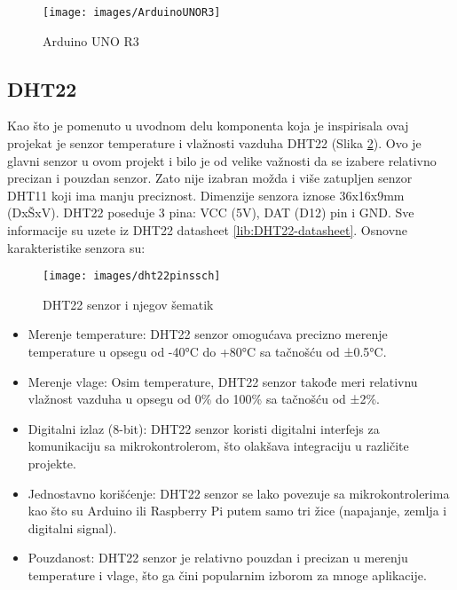 \documentclass[a4paper, 12pt]{article}
\begin{document}
\begin{figure}[H]
\centering
\texttt{[image: images/ArduinoUNOR3]}
\caption{Arduino UNO R3} \label{fig:Arduino}
\end{figure}

\pagebreak


	\subsection{DHT22}

\vspace{10pt}

Kao što je pomenuto u uvodnom delu komponenta koja je inspirisala ovaj projekat je senzor temperature i vlažnosti vazduha DHT22 (Slika \ref{fig:dht22pinssch}). Ovo je glavni senzor u ovom projekt i bilo je od velike važnosti da se izabere relativno precizan i pouzdan senzor. Zato nije izabran možda i više zatupljen senzor DHT11 koji ima manju preciznost. Dimenzije senzora iznose 36x16x9mm (DxŠxV). DHT22 poseduje 3 pina: VCC (5V), DAT (D12) pin i GND. Sve informacije su uzete iz DHT22 datasheet \ref{lib:DHT22-datasheet}. Osnovne karakteristike senzora su:

\begin{figure}[H]
\centering
\texttt{[image: images/dht22pinssch]}
\caption{DHT22 senzor i njegov šematik} \label{fig:dht22pinssch}
\end{figure}

\begin{itemize}
	\item Merenje temperature: DHT22 senzor omogućava precizno merenje temperature u opsegu od -40°C do +80°C sa tačnošću od ±0.5°C.
	\item Merenje vlage: Osim temperature, DHT22 senzor takođe meri relativnu vlažnost vazduha u opsegu od 0\% do 100\% sa tačnošću od ±2\%.
	\sloppypar
	\item Digitalni izlaz (8-bit): DHT22 senzor koristi digitalni interfejs za komunikaciju sa mikrokontrolerom, što olakšava integraciju u različite projekte.
	\item Jednostavno korišćenje: DHT22 senzor se lako povezuje sa mikrokontrolerima kao što su Arduino ili Raspberry Pi putem samo tri žice (napajanje, zemlja i digitalni signal).
	\item Pouzdanost: DHT22 senzor je relativno pouzdan i precizan u merenju temperature i vlage, što ga čini popularnim izborom za mnoge aplikacije.
\end{itemize}
\end{document}
